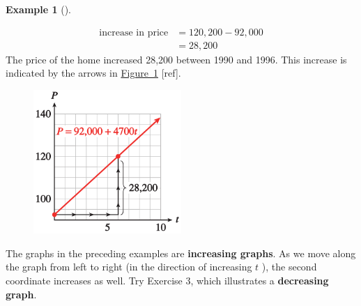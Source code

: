 \documentclass[10pt,]{book}
\newcommand{\terminology}[1]{\textbf{#1}}
\theoremstyle{plain}
\theoremstyle{definition}
\theoremstyle{definition}
\newtheorem{example}[theorem]{Example}
\numberwithin{equation}{section}
\newcommand{\amp}{ & }
\begin{document}
\begin{example}[]
\begin{enumerate}[label=*\alph**]
            \begin{align*}
\text{increase in price}\amp=120,200-92,000
                \\
\amp=28,200
\end{align*}  
            The price of the home increased \textdollar{}28,200 between 1990 and 1996.  This increase is indicated by the arrows in \hyperref[fig-median-house]{Figure~\ref{fig-median-house}} [ref].%
\leavevmode%
\begin{figure}
\centering
\includegraphics[width=0.50\textwidth,]{images/fig1-3.svg}\caption{\label{fig-median-house}}
\end{figure}
\end{enumerate}
\end{example}
\par
The graphs in the preceding examples are \terminology{increasing graphs}.  As we move along the graph from left to right (in the direction of increasing \(t\) ), the second coordinate increases as well.  Try Exercise 3, which illustrates a \terminology{decreasing graph}.%
\end{document}
